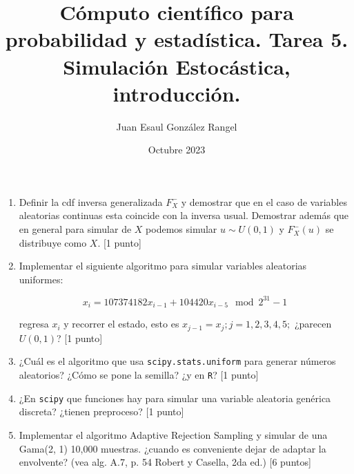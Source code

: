 \documentclass{article}
\title{Cómputo científico para probabilidad y estadística. Tarea 5.\\
Simulación Estocástica, introducción.}
\author{Juan Esaul González Rangel}
\date{Octubre 2023}
\begin{document}
\maketitle


\begin{enumerate}

    \item Definir la cdf inversa generalizada $F^-_X$ y demostrar que en el caso de 
    variables aleatorias continuas esta coincide con la inversa usual. Demostrar 
    además que en general para simular de $X$ podemos simular $u \sim U (0, 1)$ y 
    $F^-_X (u)$ se distribuye como $X$. [1 punto]

    \item Implementar el siguiente algoritmo para simular variables aleatorias 
    uniformes:
    
    \[ x_i = 107374182x_{i-1} + 104420x_{i-5} \mod 2^{31} - 1\]
    
    regresa $x_i$ y recorrer el estado, esto es $x_{j-1} = x_j ; j = 1, 2, 3, 4, 5;$ 
    ¿parecen $U (0, 1)$? [1 punto]

    \item ¿Cuál es el algoritmo que usa \texttt{scipy.stats.uniform} para generar 
    números aleatorios? ¿Cómo se pone la semilla? ¿y en \texttt{R}? [1 punto]


    \item ¿En \texttt{scipy} que funciones hay para simular una variable aleatoria 
    genérica discreta? ¿tienen preproceso? [1 punto]



    \item Implementar el algoritmo Adaptive Rejection Sampling y simular de una 
    Gama(2, 1) 10,000 muestras. ¿cuando es conveniente dejar de adaptar la envolvente?
     (vea alg. A.7, p. 54 Robert y Casella, 2da ed.) [6 puntos]
   
\end{enumerate}




 
\end{document}
